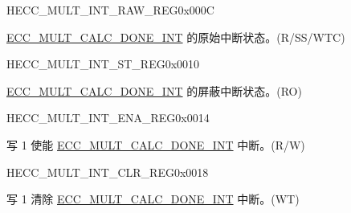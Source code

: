\begin{register}{H}{ECC\_MULT\_INT\_RAW\_REG}{0x000C}\label{regdesc:ECCMULTINTRAWREG}
%
%
\regnewline%
\begin{regdesc}\begin{reglist}
\label{fielddesc:ECCMULTCALCDONEINTRAW}\item [ECC\_MULT\_CALC\_DONE\_INT\_RAW] \hyperref[int:ECCMULTCALCDONEINT]{ECC\_MULT\_CALC\_DONE\_INT} 的原始中断状态。(R/SS/WTC)
\end{reglist}\end{regdesc}
\end{register}


\begin{register}{H}{ECC\_MULT\_INT\_ST\_REG}{0x0010}\label{regdesc:ECCMULTINTSTREG}
%
%
\regnewline%
\begin{regdesc}\begin{reglist}
\label{fielddesc:ECCMULTCALCDONEINTST}\item [ECC\_MULT\_CALC\_DONE\_INT\_ST] \hyperref[int:ECCMULTCALCDONEINT]{ECC\_MULT\_CALC\_DONE\_INT} 的屏蔽中断状态。(RO)
\end{reglist}\end{regdesc}
\end{register}


\begin{register}{H}{ECC\_MULT\_INT\_ENA\_REG}{0x0014}\label{regdesc:ECCMULTINTENAREG}
%
%
\regnewline%
\begin{regdesc}\begin{reglist}
\label{fielddesc:ECCMULTCALCDONEINTENA}\item [ECC\_MULT\_CALC\_DONE\_INT\_ENA] 写 1 使能 \hyperref[int:ECCMULTCALCDONEINT]{ECC\_MULT\_CALC\_DONE\_INT} 中断。(R/W)
\end{reglist}\end{regdesc}
\end{register}


\begin{register}{H}{ECC\_MULT\_INT\_CLR\_REG}{0x0018}\label{regdesc:ECCMULTINTCLRREG}
%
%
\regnewline%
\begin{regdesc}\begin{reglist}
\label{fielddesc:ECCMULTCALCDONEINTCLR}\item [ECC\_MULT\_CALC\_DONE\_INT\_CLR] 写 1 清除 \hyperref[int:ECCMULTCALCDONEINT]{ECC\_MULT\_CALC\_DONE\_INT} 中断。(WT)
\end{reglist}\end{regdesc}
\end{register}


